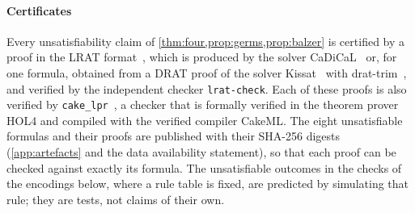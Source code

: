 \paragraph{Certificates}
Every unsatisfiability claim of \cref{thm:four,prop:germs,prop:balzer} is
certified by a proof in the LRAT format~\cite{CruzFilipeEtAl17}, which is produced by the solver
CaDiCaL~\cite{CaDiCaL2} or, for one formula, obtained from a DRAT proof of the
solver Kissat~\cite{Kissat20} with \textsf{drat-trim}~\cite{WetzlerHeuleHunt14},
and verified by the independent checker \texttt{lrat-check}. Each of these
proofs is also verified by \texttt{cake\_lpr}~\cite{TanHeuleMyreen21}, a checker
that is formally verified in the theorem prover HOL4 and compiled with the
verified compiler CakeML. The eight
unsatisfiable formulas and their proofs are published with their SHA-256
digests (\cref{app:artefacts} and the data availability statement), so that
each proof can be checked against exactly its formula. The unsatisfiable
outcomes in the checks of the encodings below, where a rule table is fixed, are
predicted by simulating that rule; they are tests, not claims of their own.

